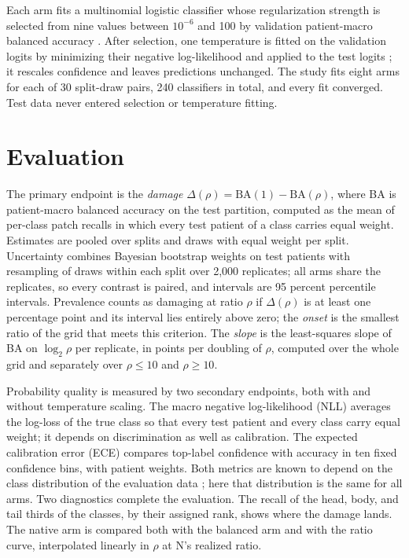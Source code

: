 \documentclass[11pt]{article}
\begin{document}
\noindent Each arm fits a multinomial logistic classifier whose regularization strength is selected from nine values between $10^{-6}$ and 100 by validation patient-macro balanced accuracy \citep{queisler2026patientShortage}. After selection, one temperature is fitted on the validation logits by minimizing their negative log-likelihood and applied to the test logits \citep{guo2017calibration}; it rescales confidence and leaves predictions unchanged. The study fits eight arms for each of 30 split-draw pairs, 240 classifiers in total, and every fit converged. Test data never entered selection or temperature fitting.

\section{Evaluation}
\label{sec:evaluation}
The primary endpoint is the \emph{damage} $\Delta(\rho)=\mathrm{BA}(1)-\mathrm{BA}(\rho)$, where BA is patient-macro balanced accuracy on the test partition, computed as the mean of per-class patch recalls in which every test patient of a class carries equal weight. Estimates are pooled over splits and draws with equal weight per split. Uncertainty combines Bayesian bootstrap weights on test patients \citep{rubin1981bayesian} with resampling of draws within each split over 2,000 replicates; all arms share the replicates, so every contrast is paired, and intervals are 95 percent percentile intervals. Prevalence counts as damaging at ratio $\rho$ if $\Delta(\rho)$ is at least one percentage point and its interval lies entirely above zero; the \emph{onset} is the smallest ratio of the grid that meets this criterion. The \emph{slope} is the least-squares slope of BA on $\log_2\rho$ per replicate, in points per doubling of $\rho$, computed over the whole grid and separately over $\rho\leq10$ and $\rho\geq10$.

Probability quality is measured by two secondary endpoints, both with and without temperature scaling. The macro negative log-likelihood (NLL) averages the log-loss of the true class so that every test patient and every class carry equal weight; it depends on discrimination as well as calibration. The expected calibration error (ECE) compares top-label confidence with accuracy in ten fixed confidence bins, with patient weights. Both metrics are known to depend on the class distribution of the evaluation data \citep{mosquera2024classImbalance}; here that distribution is the same for all arms. Two diagnostics complete the evaluation. The recall of the head, body, and tail thirds of the classes, by their assigned rank, shows where the damage lands. The native arm is compared both with the balanced arm and with the ratio curve, interpolated linearly in $\rho$ at N's realized ratio.
\end{document}
